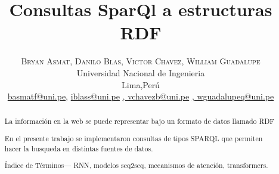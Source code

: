 \documentclass[conference]{IEEEtran}
\begin{document}
\title{\bf{Consultas SparQl a estructuras RDF}}

\author{%
\textsc{Bryan Asmat}\textsc{, Danilo Blas}\textsc{, Victor Chavez}\textsc{, William Guadalupe}\\
\normalsize Universidad Nacional de Ingenieria \\ %
\normalsize Lima,Perú \\ %
\normalsize \href{mailto:basmatf@uni.pe}{basmatf@uni.pe},  \href{mailto:iblass@uni.pe}{iblass@uni.pe} \href{mailto:vchavezb@uni.pe}{,  vchavezb@uni.pe} \href{mailto:wguadalupeq@uni.pe}{,  wguadalupeq@uni.pe} %
}





\maketitle

\begin{abstract}
La información en la web se puede representar bajo un formato de datos llamado RDF

En el presente trabajo se implementaron consultas de tipos SPARQL que permiten hacer la busqueda en distintas fuentes de datos.

\vspace{0.2cm}


\'Indice de T\'erminos— RNN, modelos seq2seq, mecanismos de atenci\'on, transformers.
    
\end{abstract}
\end{document}
